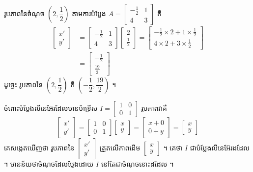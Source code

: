 \begin{example}[ឧទាហរណ៍ ១]
រូបភាពនៃចំណុច $\left(2, \dfrac{1}{2}\right)$ តាមការបំប្លែង $A = \begin{bmatrix} -\frac{1}{2} & 1\\ 4 & 3 \end{bmatrix}$ គឺ
\[
\begin{aligned}
\begin{bmatrix} x'\\ y' \end{bmatrix} &= \begin{bmatrix} -\frac{1}{2} & 1\\ 4 & 3 \end{bmatrix}\begin{bmatrix} 2\\ \frac{1}{2} \end{bmatrix} = \begin{bmatrix} -\frac{1}{2}\times 2 + 1\times\frac{1}{2}\\[3pt] 4\times 2 + 3\times\frac{1}{2} \end{bmatrix}\\
&= \begin{bmatrix} -\frac{1}{2}\\[3pt] \frac{19}{2} \end{bmatrix}
\end{aligned}
\]
ដូច្នេះ រូបភាពនៃ $\left(2, \dfrac{1}{2}\right)$ គឺ $\left(-\dfrac{1}{2}, \dfrac{19}{2}\right)$ ។
\end{example}

ចំពោះបំប្លែងលីនេអ៊ែរដែលមានម៉ាទ្រីស $I = \begin{bmatrix} 1 & 0\\ 0 & 1 \end{bmatrix}$ រូបភាពវាគឺ
\[ \begin{bmatrix} x'\\ y' \end{bmatrix} = \begin{bmatrix} 1 & 0\\ 0 & 1 \end{bmatrix}\begin{bmatrix} x\\ y \end{bmatrix} = \begin{bmatrix} x + 0\\ 0 + y \end{bmatrix} = \begin{bmatrix} x\\ y \end{bmatrix} \]
គេសង្កេតឃើញថា រូបភាពនៃ $\begin{bmatrix} x'\\ y' \end{bmatrix}$ ត្រួតលើភាពដើម $\begin{bmatrix} x\\ y \end{bmatrix}$ ។ គេថា $I$ ជាបំប្លែងលីនេអ៊ែរដដែល ។ មានន័យថាចំណុចដែលប្លែងដោយ $I$ នៅតែជាចំណុចនោះដដែល ។

